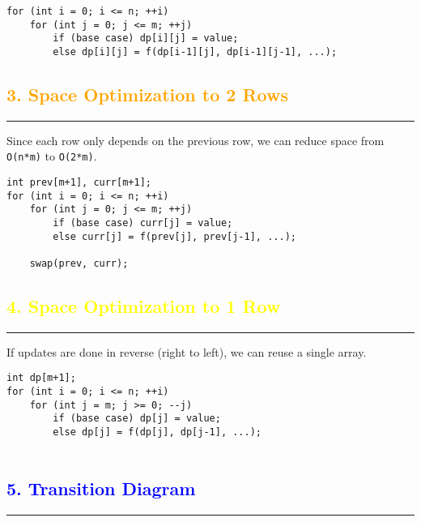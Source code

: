 \begin{Verbatim}[fontsize=\small]
for (int i = 0; i <= n; ++i) 
    for (int j = 0; j <= m; ++j) 
        if (base case) dp[i][j] = value;
        else dp[i][j] = f(dp[i-1][j], dp[i-1][j-1], ...);
\end{Verbatim}

\subsection*{\textcolor{orange}{\textbf{3. Space Optimization to 2 Rows}}}
\rule{\linewidth}{0.5mm}

Since each row only depends on the previous row, we can reduce space from \texttt{O(n*m)} to \texttt{O(2*m)}.

\begin{Verbatim}[fontsize=\small]
int prev[m+1], curr[m+1];
for (int i = 0; i <= n; ++i) 
    for (int j = 0; j <= m; ++j) 
        if (base case) curr[j] = value;
        else curr[j] = f(prev[j], prev[j-1], ...);
    
    swap(prev, curr);
\end{Verbatim}

\subsection*{\textcolor{yellow}{\textbf{4. Space Optimization to 1 Row}}}
\rule{\linewidth}{0.5mm}

If updates are done in reverse (right to left), we can reuse a single array.

\begin{Verbatim}[fontsize=\small]
int dp[m+1];
for (int i = 0; i <= n; ++i)
    for (int j = m; j >= 0; --j)
        if (base case) dp[j] = value;
        else dp[j] = f(dp[j], dp[j-1], ...);
    
\end{Verbatim}

\subsection*{\textcolor{blue}{\textbf{5. Transition Diagram}}}
\rule{\linewidth}{0.5mm}

\begin{center}
\end{center}

